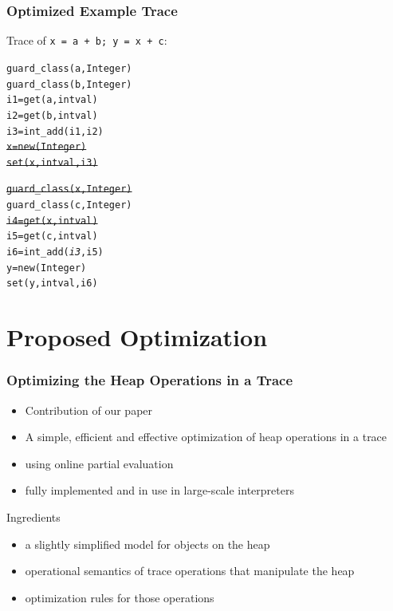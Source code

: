 \documentclass[utf8x]{beamer}
\begin{document}
\begin{frame}[containsverbatim]
  \frametitle{Optimized Example Trace}
  Trace of \texttt{x = a + b; y = x + c}:
\begin{alltt}
guard_class(a, Integer)
guard_class(b, Integer)
i1 = get(a, intval)
i2 = get(b, intval)
i3 = int_add(i1, i2)
\sout{x = new(Integer)}
\sout{set(x, intval, i3)}
\end{alltt}
\begin{alltt}
\sout{guard_class(x, Integer)}
guard_class(c, Integer)
\sout{i4 = get(x, intval)}
i5 = get(c, intval)
i6 = int_add(\emph{i3}, i5)
y = new(Integer)
set(y, intval, i6)
\end{alltt}
\end{frame}

\section{Proposed Optimization}

\begin{frame}
  \frametitle{Optimizing the Heap Operations in a Trace}
  \begin{itemize}
      \item Contribution of our paper
      \item A simple, efficient and effective optimization of heap operations in a trace
      \item using online partial evaluation
      \item fully implemented and in use in large-scale interpreters
  \end{itemize}
  \pause
  \begin{block}{Ingredients}
      \begin{itemize}
          \item a slightly simplified model for objects on the heap
          \item operational semantics of trace operations that manipulate the heap
          \item optimization rules for those operations
      \end{itemize}
  \end{block}
\end{frame}
\end{document}
